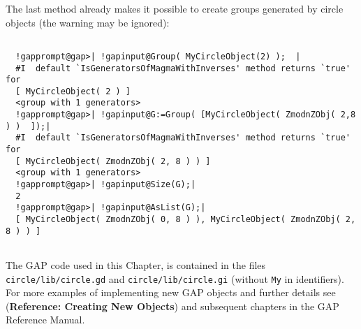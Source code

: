 \documentclass[a4paper,11pt]{report}
\begin{document}
{{\begin{Verbatim}[commandchars=@|A,fontsize=\small,frame=single,label=Example]
\end{Verbatim}
 The last method already makes it possible to create groups generated by circle
objects (the warning may be ignored): 
\begin{Verbatim}[commandchars=!@|,fontsize=\small,frame=single,label=Example]
  
  !gapprompt@gap>| !gapinput@Group( MyCircleObject(2) );  |
  #I  default `IsGeneratorsOfMagmaWithInverses' method returns `true' for
  [ MyCircleObject( 2 ) ]
  <group with 1 generators>
  !gapprompt@gap>| !gapinput@G:=Group( [MyCircleObject( ZmodnZObj( 2,8 ) )  ]);|
  #I  default `IsGeneratorsOfMagmaWithInverses' method returns `true' for
  [ MyCircleObject( ZmodnZObj( 2, 8 ) ) ]
  <group with 1 generators>
  !gapprompt@gap>| !gapinput@Size(G);|
  2
  !gapprompt@gap>| !gapinput@AsList(G);|
  [ MyCircleObject( ZmodnZObj( 0, 8 ) ), MyCircleObject( ZmodnZObj( 2, 8 ) ) ]
  
\end{Verbatim}
 The \textsf{GAP} code used in this Chapter, is contained in the files \texttt{circle/lib/circle.gd} and \texttt{circle/lib/circle.gi} (without \texttt{My} in identifiers). For more examples of implementing new \textsf{GAP} objects and further details see  (\textbf{Reference: Creating New Objects}) and subsequent chapters in the \textsf{GAP} Reference Manual. }

 }

 
\end{document}
